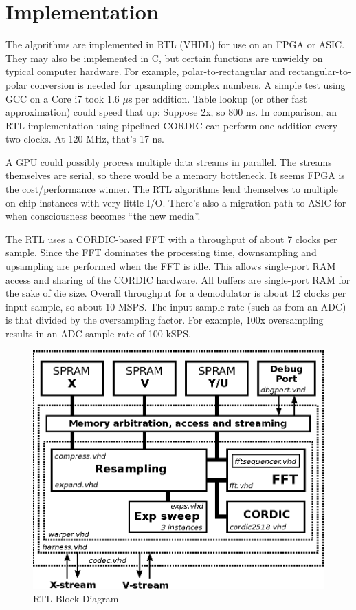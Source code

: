 \section{Implementation}

The algorithms are implemented in RTL (VHDL) for use on an FPGA or ASIC.
They may also be implemented in C, but certain functions are unwieldy on
typical computer hardware. For example, polar-to-rectangular and
rectangular-to-polar conversion is needed for upsampling complex numbers.
A simple test using GCC on a Core i7 took 1.6 $\mu$s per addition.
Table lookup (or other fast approximation) could speed that up:
Suppose 2x, so 800 ns.
In comparison, an RTL implementation using pipelined CORDIC can perform
one addition every two clocks. At 120 MHz, that's 17 ns.

A GPU could possibly process multiple data streams in parallel.
The streams themselves are serial, so there would be a memory bottleneck.
It seems FPGA is the cost/performance winner.
The RTL algorithms lend themselves to multiple on-chip instances with very
little I/O. There's also a migration path to ASIC for when consciousness
becomes ``the new media''.

The RTL uses a CORDIC-based FFT with a throughput of about 7 clocks per sample.
Since the FFT dominates the processing time, downsampling and upsampling
are performed when the FFT is idle.
This allows single-port RAM access and sharing of the CORDIC hardware. 
All buffers are single-port RAM for the sake of die size.
Overall throughput for a demodulator is about 12 clocks per input sample,
so about 10 MSPS. The input sample rate (such as from an ADC) is that divided
by the oversampling factor. For example, 100x oversampling results in
an ADC sample rate of 100 kSPS.

\begin{figure}
	\centering
	\includegraphics[width=0.8\linewidth]{../source/rtl_e}
	\caption[Quantum Time to Relative Time Hardware]{RTL Block Diagram}
	\label{fig:rtl}
\end{figure}

